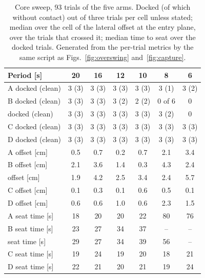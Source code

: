 \begin{table}[t]
  \caption{Core sweep, 93 trials of the five arms. Docked (of which without contact) out of three trials per cell unless stated; median over the cell of the lateral offset at the entry plane, over the trials that crossed it; median time to seat over the docked trials. Generated from the per-trial metrics by the same script as Figs.~\ref{fig:overswing} and~\ref{fig:capture}.}
  \label{tab:core}
  \centering
  \footnotesize\setlength{\tabcolsep}{2.6pt}
  \begin{tabular}{@{}lcccccc@{}}
    \toprule
    Period [s] & 20 & 16 & 12 & 10 & 8 & 6 \\
    \midrule
    A docked (clean) & 3 (3) & 3 (3) & 3 (3) & 3 (3) & 3 (1) & 3 (2) \\
    B docked (clean) & 3 (3) & 3 (3) & 3 (2) & 2 (2) & 0 of 6 & 0 \\
    \Bgt{} docked (clean) & 3 (3) & 3 (3) & 3 (3) & 3 (3) & 3 (2) & 0 \\
    C docked (clean) & 3 (3) & 3 (3) & 3 (3) & 3 (3) & 3 (3) & 3 (3) \\
    D docked (clean) & 3 (3) & 3 (3) & 3 (3) & 3 (3) & 3 (3) & 3 (3) \\
    \midrule
    A offset [cm] & 0.5 & 0.7 & 0.2 & 0.7 & 2.1 & 3.4 \\
    B offset [cm] & 2.1 & 3.6 & 1.4 & 0.3 & 4.3 & 2.4 \\
    \Bgt{} offset [cm] & 1.9 & 4.2 & 2.5 & 3.4 & 2.4 & 5.7 \\
    C offset [cm] & 0.1 & 0.3 & 0.1 & 0.6 & 0.5 & 0.1 \\
    D offset [cm] & 0.6 & 0.6 & 1.0 & 0.6 & 2.3 & 1.5 \\
    \midrule
    A seat time [s] & 18 & 20 & 20 & 22 & 80 & 76 \\
    B seat time [s] & 23 & 27 & 34 & 37 & -- & -- \\
    \Bgt{} seat time [s] & 29 & 27 & 34 & 39 & 56 & -- \\
    C seat time [s] & 19 & 24 & 19 & 20 & 18 & 21 \\
    D seat time [s] & 22 & 21 & 20 & 21 & 19 & 24 \\
    \bottomrule
  \end{tabular}
\end{table}

